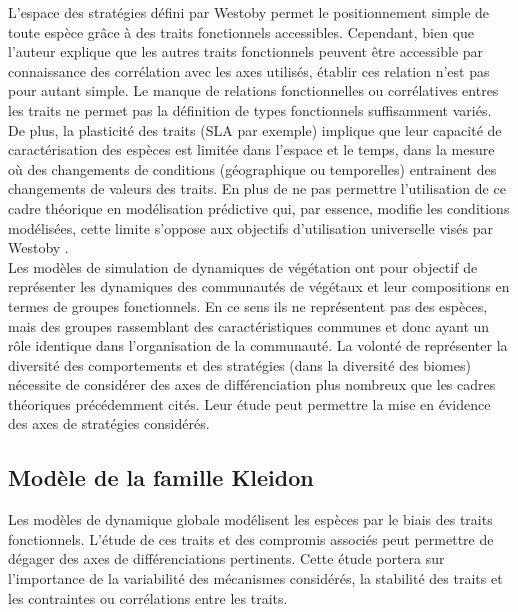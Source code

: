 \documentclass[french]{article}
\begin{document}
{%

\indent L'espace des stratégies défini par Westoby permet le positionnement simple de toute espèce grâce à des traits fonctionnels accessibles. Cependant, bien que l'auteur explique que les autres traits fonctionnels peuvent être accessible par connaissance des corrélation avec les axes utilisés, établir ces relation n'est pas pour autant simple. Le manque de relations fonctionnelles ou corrélatives entres les traits ne permet pas la définition de types fonctionnels suffisamment variés.\\
\indent De plus, la plasticité des traits (SLA par exemple) implique que leur capacité de caractérisation des espèces est limitée dans l'espace et le temps, dans la mesure où des changements de conditions (géographique ou temporelles) entrainent des changements de valeurs des traits. En plus de ne pas permettre l'utilisation de ce cadre théorique en modélisation prédictive qui, par essence, modifie les conditions modélisées, cette limite s'oppose aux objectifs d'utilisation universelle visés par Westoby \cite{Westoby1998}.\\
\indent Les modèles de simulation de dynamiques de végétation ont pour objectif de représenter les dynamiques des communautés de végétaux et leur compositions en termes de groupes fonctionnels. En ce sens ils ne représentent pas des espèces, mais des groupes rassemblant des caractéristiques communes et donc ayant un rôle identique dans l'organisation de la communauté. La volonté de représenter la diversité des comportements et des stratégies (dans la diversité des biomes) nécessite de considérer des axes de différenciation plus nombreux que les cadres théoriques précédemment cités. Leur étude peut permettre la mise en évidence des axes de stratégies considérés.

\subsection{Modèle de la famille Kleidon}

\indent Les modèles de dynamique globale modélisent les espèces par le biais des traits fonctionnels. L'étude de ces traits et des compromis associés peut permettre de dégager des axes de différenciations pertinents. Cette étude portera sur l'importance de la variabilité des mécanismes considérés, la stabilité des traits et les contraintes ou corrélations entre les traits.\\

}
\end{document}

